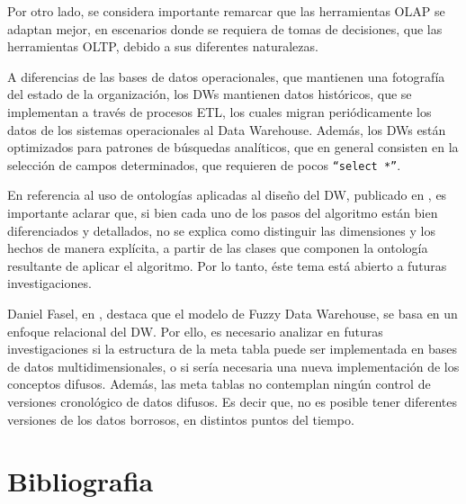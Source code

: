 \documentclass[a4paper,11pt]{article}
\begin{document}
  Por otro lado, se considera importante remarcar que las herramientas OLAP se adaptan mejor, en escenarios donde se requiera de tomas de decisiones,
  que las herramientas OLTP, debido a sus diferentes naturalezas.
 
  A diferencias de las bases de datos operacionales, que mantienen una fotografía del estado
  de la organización, los DWs mantienen datos históricos, que se implementan a través de procesos ETL, los cuales migran periódicamente los datos de los sistemas
  operacionales al Data Warehouse.
  Además, los DWs están optimizados para patrones de búsquedas analíticos, que en general consisten en la selección de campos determinados, que requieren de pocos
  \texttt{``select *''}.
 
  
  En referencia al uso de ontologías aplicadas al diseño del DW, publicado en \cite{ontologias}, es importante aclarar que, si bien cada uno de los pasos del
  algoritmo están bien diferenciados y detallados, no se explica como distinguir las dimensiones y los hechos de manera explícita, a partir de las clases
  que componen la ontología resultante de aplicar el algoritmo. Por lo tanto, éste tema está abierto a futuras investigaciones.
  
  Daniel Fasel, en \cite {Fasel14}, destaca que el modelo de Fuzzy Data Warehouse, se basa en un enfoque relacional del DW.
  Por ello, es necesario analizar en futuras investigaciones si la estructura de la meta tabla puede ser implementada en bases de datos multidimensionales,
  o si sería necesaria una nueva implementación de los conceptos difusos.
  Además, las meta tablas no contemplan ningún control de versiones cronológico de datos difusos.
  Es decir que, no es posible tener diferentes versiones de los datos borrosos, en distintos puntos del tiempo.
  


  \section{Bibliografia}

  \printbibliography

  
  
  \printindex %
  
\end{document}
